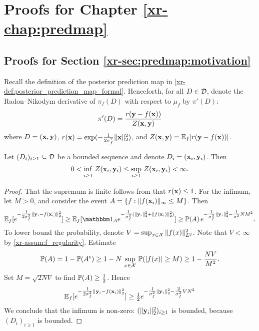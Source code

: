 \documentclass[12pt, twoside]{report}
\newcommand{\xrprefix}[1]{xr-#1}
\begin{document}
\chapter
    {Proofs for Chapter \ref{\xrprefix{chap:predmap}}}
\label{app:proofs_predmap}

\section{Proofs for Section \ref{\xrprefix{sec:predmap:motivation}}}
\label{sec:proofs_predmap:motivation}

Recall the definition of the posterior prediction map in \cref{\xrprefix{def:posterior_prediction_map_formal}}.
Henceforth, for all $D \in \D$, denote the Radon--Nikodym derivative of $\pi_f(D)$ with respect to $\mu_f$ by $\pi'(D)$:
\begin{equation}
    \pi'(D) = \frac
        {r(\vy - f(\vx))}
        {Z(\vx, \vy)}
\end{equation}
where $D = (\vx, \vy)$,
$r(\vx) = \exp({-\tfrac{1}{2\sigma_f^2}\norm{\vx}_2^2})$,
and $Z(\vx, \vy) = \E_f[r(\vy - f(\vx))]$.

\begin{lemma} \label{lem:inf_sup_Z}
    Let $(D_i)_{i \ge 1} \sub \D$ be a bounded sequence and denote $D_i = (\vx_i, \vy_i)$.
    Then
    \begin{equation}
        0
        < \inf_{i \ge 1}\, Z(\vx_i, \vy_i)
        \le \sup_{i \ge 1}\, Z(\vx_i, \vy_i)
        < \infty.
    \end{equation}
\end{lemma}
\begin{proof}
    That the supremum is finite follows from that $r(\vx) \le 1$.
    For the infimum,
    let $M > 0$, and consider the event $A = \set{f : \norm{f(\vx_i)}_\infty \le M}$.
    Then
    \begin{equation}
        \E_f[e^{-\tfrac1{2\sigma_f^2}\norm{\vy_i - f(\vx_i)}_2^2}]
        \ge \E_f[\ind_A e^{-\tfrac1{\sigma_f^2}(\norm{\vy_i}_2^2 + \norm{f(\vx_i)}_2^2)}]
        \ge \P(A)\, e^{-\tfrac1{\sigma_f^2}\norm{\vy_i}_2^2 - \tfrac{1}{\sigma^2} N M^2}.
    \end{equation}
    To lower bound the probability, denote $V = \sup_{x \in \X}\, \norm{f(x)}^2_{L^2}$.
    Note that $V < \infty$ by \cref{\xrprefix{assum:f_regularity}}.
    Estimate
    \begin{equation}
        \P(A)
        = 1 - \P(A^\c) \vphantom{\sup_{x \in \X}}
        \ge 1 - \vphantom{\frac NN} N\,\sup_{x \in \X}\, \P(\abs{f(x)} \ge M)
        \ge 1 - \frac{N V}{M^2}.
    \end{equation}
    Set $M = \sqrt{2 N V}$ to find $\P(A) \ge \tfrac12$.
    Hence
    \begin{equation} \label{lem:inf_sup_Z:lower_bound}
        \E_f[e^{-\tfrac1{2\sigma_f^2}\norm{\vy_i - f(\vx_i)}_2^2}]
        \ge \tfrac12 e^{-\tfrac1{\sigma_f^2}\norm{\vy_i}_2^2 - \tfrac{2}{\sigma_f^2} VN^2}
    \end{equation}
    We conclude that the infimum is non-zero: $(\norm{\vy_i}^2_2)_{i \ge 1}$ is bounded, because $(D_i)_{i \ge 1}$ is bounded.
\end{proof}
\end{document}

